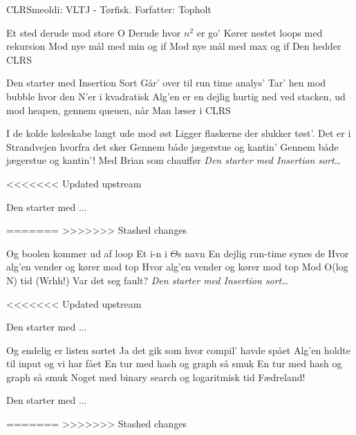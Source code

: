 \begin{sang}{CLRS}{meoldi: VLTJ - Tørfisk. Forfatter: Topholt}
    \begin{vers}
    Et sted derude mod store O
    Derude hvor $n^2$ er go'
    Kører nestet loops med rekursion
    Mod nye mål med min og if
    Mod nye mål med max og if
    Den hedder CLRS
    \end{vers}
    
    \begin{omkvaed}
    Den starter med Insertion Sort
    Går' over til run time analys' 
    Tar' hen mod bubble hvor den N'er i kvadratisk
    Alg'en er en dejlig hurtig ned ved stacken, ud mod heapen, gennem queuen, når
    Man læser i CLRS
    \end{omkvaed}
    
    \begin{vers}
    I de kolde køleskabe langt ude mod øst
    Ligger flaskerne der slukker tøst'.
    Det er i Strandvejen hvorfra det sker
    Gennem både jægerstue og kantin'
    Gennem både jægerstue og kantin'!
    Med Brian som chauffør
    \emph{Den starter med Insertion sort}\ldots
    \end{vers}
    
<<<<<<< Updated upstream
    \begin{omkvaed}
    Den starter med ...
    \end{omkvaed}
    
=======
>>>>>>> Stashed changes
    \begin{vers}
    Og boolen kommer ud af loop
    Et i-n i $\Theta$s navn
    En dejlig run-time synes de
    Hvor alg'en vender og kører mod top
    Hvor alg'en vender og kører mod top
    Mod O(log N) tid (Wrhh!)
    Var det seg fault?
    \emph{Den starter med Insertion sort}\ldots
    \end{vers}
    
<<<<<<< Updated upstream
    \begin{omkvaed}
    Den starter med ...
    \end{omkvaed}

    \begin{vers}
    Og endelig er listen sortet
    Ja det gik som hvor compil' havde spået
    Alg'en holdte til input og vi har fået
    En tur med hash og graph så smuk
    En tur med hash og graph så smuk
    Noget med binary search og logaritmisk tid
    Fædreland!
    \end{vers}
        
    \begin{omkvaed}
    Den starter med ...
    \end{omkvaed}

=======
>>>>>>> Stashed changes
    \end{sang}